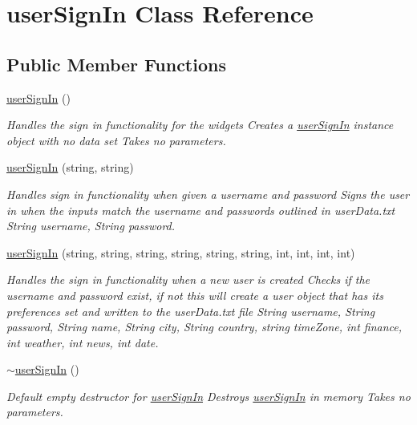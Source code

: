 \hypertarget{classuser_sign_in}{}\section{user\+Sign\+In Class Reference}
\label{classuser_sign_in}
\subsection*{Public Member Functions}
\begin{DoxyCompactItemize}
\item 
\mbox{\hyperlink{classuser_sign_in_aadda1c072fd82f92a63aeec71410669f}{user\+Sign\+In}} ()
\begin{DoxyCompactList}\small\item\em Handles the sign in functionality for the widgets  Creates a \mbox{\hyperlink{classuser_sign_in}{user\+Sign\+In}} instance object with no data set  Takes no parameters. \end{DoxyCompactList}\item 
\mbox{\hyperlink{classuser_sign_in_a206594360b0e235dad6b7d9bdb315216}{user\+Sign\+In}} (string, string)
\begin{DoxyCompactList}\small\item\em Handles sign in functionality when given a username and password  Signs the user in when the inputs match the username and passwords outlined in user\+Data.\+txt  String username, String password. \end{DoxyCompactList}\item 
\mbox{\hyperlink{classuser_sign_in_a179a4991b9e103b2fb422f25f520fe1b}{user\+Sign\+In}} (string, string, string, string, string, string, int, int, int, int)
\begin{DoxyCompactList}\small\item\em Handles the sign in functionality when a new user is created  Checks if the username and password exist, if not this will create a user object that has its preferences set and written to the user\+Data.\+txt file  String username, String password, String name, String city, String country, string time\+Zone, int finance, int weather, int news, int date. \end{DoxyCompactList}\item 
\mbox{\hyperlink{classuser_sign_in_a3a005bfb5efd54a7b9785fc39492ae4d}{$\sim$user\+Sign\+In}} ()
\begin{DoxyCompactList}\small\item\em Default empty destructor for \mbox{\hyperlink{classuser_sign_in}{user\+Sign\+In}}  Destroys \mbox{\hyperlink{classuser_sign_in}{user\+Sign\+In}} in memory  Takes no parameters. \end{DoxyCompactList}\item 

\end{DoxyCompactItemize}
